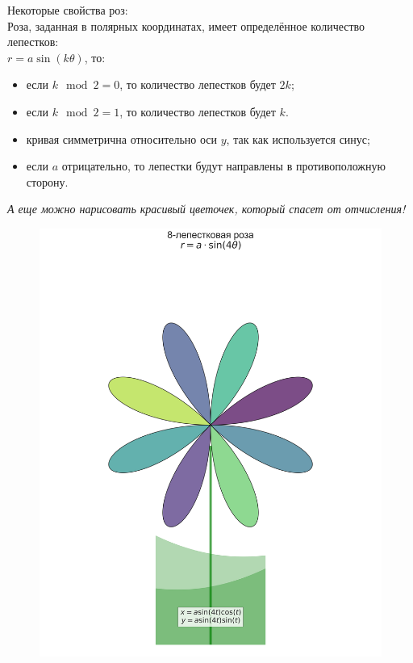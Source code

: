 \documentclass[a4paper,12pt]{article}
\begin{document}
Некоторые свойства роз:\\

Роза, заданная в полярных координатах, имеет определённое количество лепестков:\\

\( r = a \sin(k \theta) \), то:
\begin{itemize}
    \item если \( k \mod 2 = 0 \), то количество лепестков будет \( 2k \);
    \item если \( k \mod 2 = 1 \), то количество лепестков будет \( k \).
    \item кривая симметрична относительно оси \( y \), так как используется синус;
    \item если \( a \) отрицательно, то лепестки будут направлены в противоположную сторону.
\end{itemize}

\emph{А еще можно нарисовать красивый цветочек, который спасет от отчисления!}
\begin{figure}[H]
    \centering
    \includegraphics[width=0.5\linewidth]{../img/rose.png}
    \caption{}
    \label{fig:part1}
\end{figure}
\end{document}
